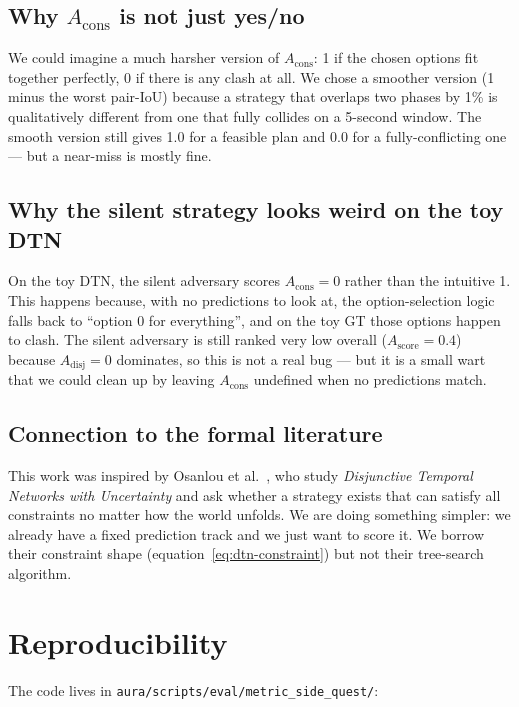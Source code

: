\documentclass[11pt]{article}
\newcommand{\Score}{A_{\text{score}}}
\newcommand{\Adisj}{A_{\text{disj}}}
\newcommand{\Acons}{A_{\text{cons}}}
\begin{document}
\subsection{Why $\Acons$ is not just yes/no}
We could imagine a much harsher version of $\Acons$: 1 if the chosen
options fit together perfectly, 0 if there is any clash at all. We
chose a smoother version (1 minus the worst pair-IoU) because a
strategy that overlaps two phases by 1\% is qualitatively different
from one that fully collides on a 5-second window. The smooth version
still gives 1.0 for a feasible plan and 0.0 for a fully-conflicting
one --- but a near-miss is mostly fine.

\subsection{Why the silent strategy looks weird on the toy DTN}
On the toy DTN, the silent adversary scores $\Acons = 0$ rather than
the intuitive 1. This happens because, with no predictions to look
at, the option-selection logic falls back to ``option 0 for
everything'', and on the toy GT those options happen to clash. The
silent adversary is still ranked very low overall ($\Score = 0.4$)
because $\Adisj = 0$ dominates, so this is not a real bug --- but it
is a small wart that we could clean up by leaving $\Acons$ undefined
when no predictions match.

\subsection{Connection to the formal literature}
This work was inspired by Osanlou et al.~\cite{osanlou2022dtnu}, who
study \emph{Disjunctive Temporal Networks with Uncertainty} and ask
whether a strategy exists that can satisfy all constraints no matter
how the world unfolds. We are doing something simpler: we already
have a fixed prediction track and we just want to score it. We borrow
their constraint shape (equation~\ref{eq:dtn-constraint}) but not
their tree-search algorithm.

\section{Reproducibility}

The code lives in
\texttt{aura/scripts/eval/metric\_side\_quest/}:
\end{document}
